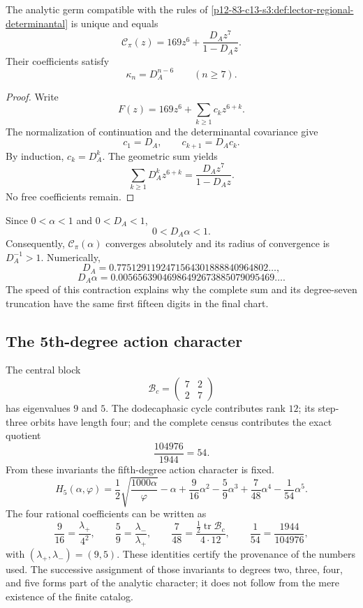 \begin{theorem}
\label{p12-83-c13-s3:thm:realizacion-analitica-graduada}
The analytic germ compatible with the rules of
\cref{p12-83-c13-s3:def:lector-regional-determinantal} is unique and equals
\[
\boxed{
\mathscr C_\pi(z)
=169z^6+\frac{D_Az^7}{1-D_Az}.}
\]
Their coefficients satisfy
\[
\kappa_n=D_A^{n-6}\qquad(n\ge7).
\]
\end{theorem}

\begin{proof}
Write
\[
F(z)=169z^6+\sum_{k\ge1}c_kz^{6+k}.
\]
The normalization of continuation and the determinantal covariance give
\[
c_1=D_A,
\qquad
c_{k+1}=D_Ac_k.
\]
By induction, \(c_k=D_A^k\). The geometric sum yields
\[
\sum_{k\ge1}D_A^kz^{6+k}
=\frac{D_Az^7}{1-D_Az}.
\]
No free coefficients remain.
\end{proof}

Since \(0<\alpha<1\) and
\(0<D_A<1\),
\[
0<D_A\alpha<1.
\]
Consequently, \(\mathscr C_\pi(\alpha)\) converges absolutely and its
radius of convergence is \(D_A^{-1}>1\). Numerically,
\[
D_A=0.7751291192471564301888840964802\ldots,
\]
\[
D_A\alpha=0.00565639046986492673885079095469\ldots.
\]
The speed of this contraction explains why the complete sum and its
degree-seven truncation have the same first fifteen digits in the
final chart.

\subsection{The 5th-degree action character}

The central block
\[
\mathcal B_c=\begin{pmatrix}7&2\\2&7\end{pmatrix}
\]
has eigenvalues \(9\) and \(5\). The dodecaphasic cycle contributes rank
\(12\); its step-three orbits have length four; and the complete census
contributes the exact quotient
\[
\frac{104976}{1944}=54.
\]
From these invariants the fifth-degree action character is fixed.
\[
\boxed{
H_5(\alpha,\varphi)
=\frac12\sqrt{\frac{1000\alpha}{\varphi}}-\alpha
+\frac9{16}\alpha^2-\frac59\alpha^3
+\frac7{48}\alpha^4-\frac1{54}\alpha^5.}
\]
The four rational coefficients can be written as
\[
\frac9{16}=\frac{\lambda_+}{4^2},
\qquad
\frac59=\frac{\lambda_-}{\lambda_+},
\qquad
\frac7{48}=\frac{\tfrac12\operatorname{tr}\mathcal B_c}{4\cdot12},
\qquad
\frac1{54}=\frac{1944}{104976},
\]
with \((\lambda_+,\lambda_-)=(9,5)\). These identities certify the
provenance of the numbers used. The successive assignment of those
invariants to degrees two, three, four, and five forms part of the analytic
character; it does not follow from the mere existence of the finite catalog.

